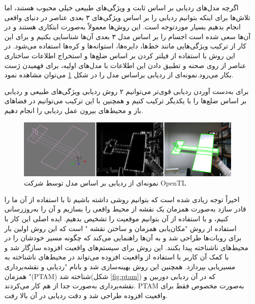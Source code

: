 اگرچه مدل‌های ردیابی بر اساس ثابت و ویژگی‌های طبیعی خیلی محبوب هستند، اما تلاش‌ها برای اینکه بتوانیم ردیابی را بر اساس ویژگی‌های ۳ بعدی عناصر در دنیای واقعی انجام بدهیم بسیار موردتوجه است. این روش‌ها معمولاً به‌صورت ابتکاری هستند و در آن‌ها سعی شده است اجسام را بر اساس مدل ۳ بعدی آن‌ها شناسایی بکنیم و برای این کار از ترکیب ویژگی‌هایی مانند خط‌ها، دایره‌ها، استوانه‌ها و کره‌ها استفاده می‌شود\cite{comport2003real}. در این روش با استفاده از  فیلتر کردن بر اساس ضلع‌ها و استخراج اطلاعات ساختاری عناصر از روی صحنه و تطبیق دادن این اطلاعات با مدل‌های اولیه، برای فهمیدن ژست بکار می‌رود\cite{zubizarreta2019framework}.نمونه‌ای از ردیابی براساس مدل را در شکل \ref{fig:opentl} می‌توان مشاهده نمود.
	
	برای به‌دست آوردن ردیابی قوی‌تر می‌توانیم ۲ روش ردیابی ویژگی‌های طبیعی و ردیابی بر اساس ضلع‌ها را با یکدیگر ترکیب کنیم\cite{vacchetti2003fusing} و همچنین با این ترکیب می‌توانیم در فضاهای باز و محیط‌های بیرون عمل ردیابی را انجام دهیم\cite{ma2019projected}.
	\begin{figure}
		\centering
		\includegraphics[width=1\linewidth]{image/mbt}
		\caption {نمونه‌ای از ردیابی بر اساس مدل توسط شرکت OpenTL   \cite{mbt}}
		\label{fig:opentl}
	\end{figure}
	اخیراً توجه زیادی شده است که بتوانیم روشی داشته باشیم تا با استفاده از آن ما را قادر سازد به‌صورت همزمان یک نقشه از محیط واقعی را بسازیم و آن را به‌روزرسانی کنیم، و با استفاده از آن بتوانیم موقعیت را تشخیص بدهیم. ایده اصلی این کار با استفاده از روش "مکان‌یابی همزمان و ساختن نقشه " است که این روش اولین بار برای روبات‌ها طراحی شد\cite{dissanayake2001solution} و به آن‌ها راهنمایی می‌کند که چگونه مسیر خودشان را در محیط‌های ناشناخته پیدا بکنند. این روش برای سیستم‌های واقعیت افزوده سازگار شد و با کمک آن کاربر با استفاده از واقعیت افزوده می‌تواند در محیط‌های ناشناخته به مسیریابی بپردازد. همچنین این روش بهینه‌سازی شد و بانام "ردیابی و نقشه‌برداری همزمان "(PTAM) شناخته شد(شکل \ref{fig:ptam}) که در آن ردیابی دوربین و نقشه‌برداری به‌صورت جدا از هم کار می‌کردند. PTAM به‌صورت مخصوص فقط برای واقعیت افزوده طراحی شد و دقت ردیابی در آن بالا رفت\cite{davison2007monoslam}.
